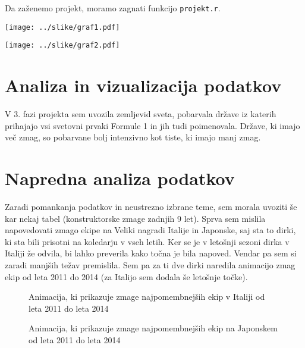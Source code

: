 \documentclass[11pt,a4paper]{article}
\begin{document}
Da zaženemo projekt, moramo zagnati funkcijo \verb|projekt.r|.

\texttt{[image: ../slike/graf1.pdf]}

\texttt{[image: ../slike/graf2.pdf]}

\section{Analiza in vizualizacija podatkov}

V 3. fazi projekta sem uvozila zemljevid sveta, pobarvala države iz katerih prihajajo vsi svetovni prvaki Formule 1 in jih tudi poimenovala. Države, ki imajo več zmag, so pobarvane bolj intenzivno kot tiste, ki imajo manj zmag. 




\pagebreak
\section{Napredna analiza podatkov}

Zaradi pomankanja podatkov in neustrezno izbrane teme, sem morala uvoziti še kar nekaj tabel (konstruktorske zmage zadnjih 9 let). Sprva sem mislila napovedovati zmago ekipe na Veliki nagradi Italije in Japonske, saj sta to dirki, ki sta bili prisotni na koledarju v vseh letih. Ker se je v letošnji sezoni dirka v Italiji že odvila, bi lahko preverila kako točna je bila napoved. Vendar pa sem si zaradi manjših težav premislila. Sem pa za ti dve dirki naredila animacijo zmag ekip od leta 2011 do 2014 (za Italijo sem dodala še letošnje točke).

\begin{figure}[H] 
\caption{Animacija, ki prikazuje zmage najpomembnejših ekip v Italiji od leta 2011 do leta 2014} 
\end{figure} 


\begin{figure}[H] 
\caption{Animacija, ki prikazuje zmage najpomembnejših ekip na Japonskem od leta 2011 do leta 2014} 
\end{figure} 
\end{document}
